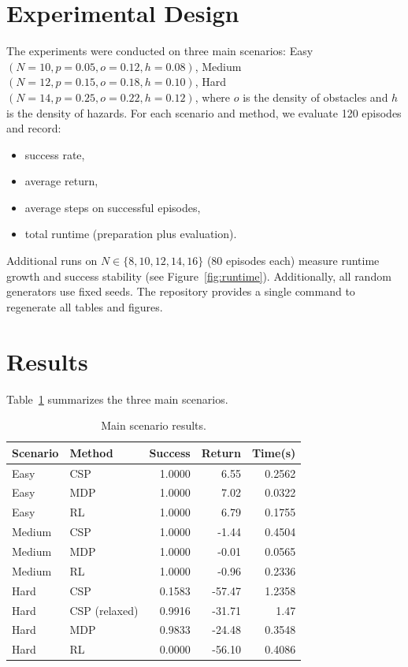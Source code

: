 \documentclass[letterpaper]{article} %
\begin{document}
\section{Experimental Design}
The experiments were conducted on three main scenarios: Easy $(N=10, p=0.05, o=0.12, h=0.08)$, Medium $(N=12, p=0.15, o=0.18, h=0.10)$, Hard $(N=14, p=0.25, o=0.22, h=0.12)$, where $o$ is the density of obstacles and $h$ is the density of hazards.
For each scenario and method, we evaluate 120 episodes and record:
\begin{itemize}
\item success rate,
\item average return,
\item average steps on successful episodes,
\item total runtime (preparation plus evaluation).
\end{itemize}

Additional runs on $N\in\{8,10,12,14,16\}$ (80 episodes each) measure runtime growth and success stability (see Figure~\ref{fig:runtime}). Additionally, all random generators use fixed seeds. The repository provides a single command to regenerate all tables and figures.

\section{Results}
Table~\ref{tab:main} summarizes the three main scenarios.

\begin{table}[ht]
\centering
\small
\caption{Main scenario results.}
\label{tab:main}
\begin{tabular}{llrrr}
\toprule
Scenario & Method & Success & Return & Time(s) \\
\midrule
Easy & CSP & 1.0000 & 6.55 & 0.2562 \\
Easy & MDP & 1.0000 & 7.02 & 0.0322 \\
Easy & RL & 1.0000 & 6.79 & 0.1755 \\
Medium & CSP & 1.0000 & -1.44 & 0.4504 \\
Medium & MDP & 1.0000 & -0.01 & 0.0565 \\
Medium & RL & 1.0000 & -0.96 & 0.2336 \\
Hard & CSP & 0.1583 & -57.47 & 1.2358 \\
Hard & CSP (relaxed) & 0.9916 & -31.71 & 1.47 \\
Hard & MDP & 0.9833 & -24.48 & 0.3548 \\
Hard & RL & 0.0000 & -56.10 & 0.4086 \\
\bottomrule
\end{tabular}
\end{table}
\end{document}
